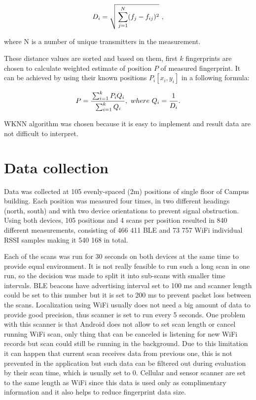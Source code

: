 $$D_i = \sqrt{\strut\sum_{j=1}^{N}(f_j-f_{ij})^2}\ ,$$

where N is a number of unique transmitters in the measurement.

These distance values are sorted and based on them, first $k$ fingerprints are chosen to calculate weighted estimate of position $P$ of measured fingerprint. It can be achieved by using their known positions $P_i[x_i,y_i]$ in a following formula:

$$ P = 
\frac
	{\strut\sum_{i=1}^{k} P_i Q_i}
	{\strut\sum_{i=1}^{k} Q_i},\
where\
	Q_i = \frac{\strut 1}{\strut D_i}.$$

WKNN algorithm was chosen because it is easy to implement and result data are not difficult to interpret.

\section{Data collection}\label{sec:DataCollection}
Data was collected at 105 evenly-spaced (2m) positions of single floor of Campus building. Each position was measured four times, in two different headings (north, south) and with two device orientations to prevent signal obstruction. Using both devices, 105 positions and 4 scans per position resulted in 840 different measurements, consisting of 466 411 BLE and 73 757 WiFi individual RSSI samples making it 540 168 in total.

Each of the scans was run for 30 seconds on both devices at the same time to provide equal environment. It is not really feasible to run such a long scan in one run, so the decision was made to split it into sub-scans with smaller time intervals. BLE beacons have advertising interval set to 100 ms and scanner length could be set to this number but it is set to 200 ms to prevent packet loss between the scans. Localization using WiFi usually does not need a big amount of data to provide good precision, thus scanner is set to run every 5 seconds. One problem with this scanner is that Android does not allow to set scan length or cancel running WiFi scan, only thing that can be canceled is listening for new WiFi records but scan could still be running in the background. Due to this limitation it can happen that current scan receives data from previous one, this is not prevented in the application but such data can be filtered out during evaluation by their scan time, which is usually set to 0. Cellular and sensor scanner are set to the same length as WiFi since this data is used only as complimentary information and it also helps to reduce fingerprint data size.

